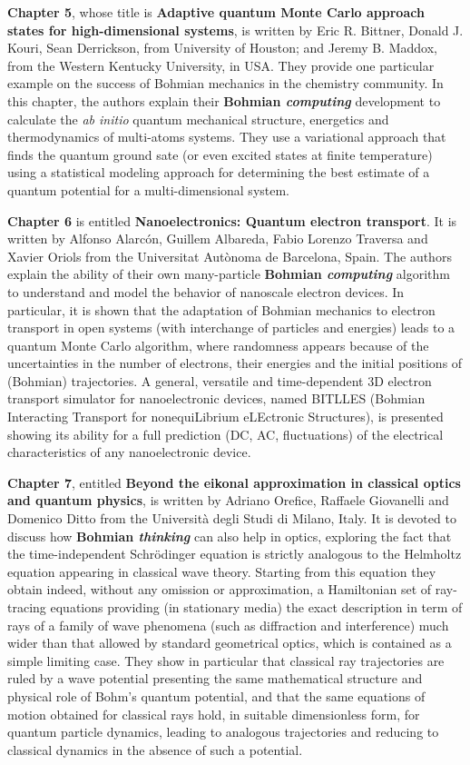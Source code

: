 \documentclass[onecolumn,nofootinbib, secnumarabic, amsmath, nobibnotes,12pt,aps,pra]{revtex4-1}
\begin{document}
\textbf{Chapter 5}, whose title is \textbf{Adaptive quantum Monte Carlo approach states for high-dimensional systems}, is written by Eric R. Bittner, Donald J. Kouri, Sean Derrickson, from University of Houston; and Jeremy B. Maddox, from the Western Kentucky University, in USA. They provide one particular example on the success of Bohmian mechanics in the chemistry community. In this chapter, the authors explain their \textbf{Bohmian \emph{computing}} development to calculate the \emph{ab initio} quantum mechanical structure, energetics and thermodynamics of multi-atoms systems. They use a variational approach that finds the quantum ground sate (or even excited states at finite temperature) using a statistical modeling approach for determining the best estimate of a quantum potential for a multi-dimensional system.

\textbf{Chapter 6} is entitled \textbf{Nanoelectronics: Quantum electron transport}. It is written by Alfonso Alarc\'on, Guillem Albareda, Fabio Lorenzo Traversa and Xavier Oriols from the Universitat Aut\`{o}noma de Barcelona, Spain. The authors explain the ability of their own many-particle \textbf{Bohmian \emph{computing}} algorithm to understand and model the behavior of nanoscale electron devices. In particular, it is shown that the adaptation of Bohmian mechanics to electron transport in open systems (with interchange of particles and energies) leads to a quantum Monte Carlo algorithm, where randomness appears because of the uncertainties in the number of electrons, their energies and the initial positions of (Bohmian) trajectories. A general, versatile and time-dependent 3D electron transport simulator for nanoelectronic devices, named BITLLES (Bohmian Interacting Transport for nonequiLibrium eLEctronic Structures), is presented showing its ability for a full prediction (DC, AC, fluctuations) of the electrical characteristics of any nanoelectronic device.

\textbf{Chapter 7}, entitled \textbf{Beyond the eikonal approximation in classical optics and quantum physics}, is written by Adriano Orefice, Raffaele Giovanelli and Domenico Ditto from the Universit\`{a} degli Studi di Milano, Italy. It is devoted to discuss how \textbf{Bohmian \emph{thinking}} can also help in optics, exploring the fact that the time-independent Schr\"{o}dinger equation is strictly analogous to the Helmholtz equation appearing in classical wave theory. Starting from this equation they obtain indeed, without any omission or approximation, a Hamiltonian set of ray-tracing equations providing (in stationary media) the exact description in term of rays of a family of wave phenomena (such as diffraction and interference) much wider than that allowed by standard geometrical optics, which is contained as a simple limiting case. They show in particular that classical ray trajectories are ruled by a wave potential presenting the same mathematical structure and physical role of Bohm's quantum potential, and that the same equations of motion obtained for classical rays hold, in suitable dimensionless form, for quantum particle dynamics, leading to analogous trajectories and reducing to classical dynamics in the absence of such a potential.
\end{document}
